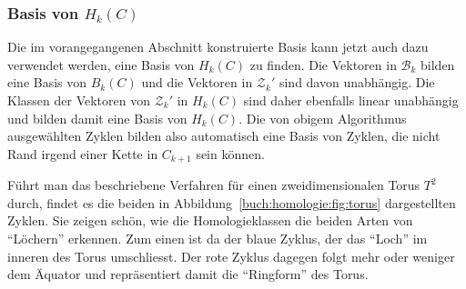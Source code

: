 \subsubsection{Basis von $H_k(C)$}
Die im vorangegangenen Abschnitt konstruierte Basis kann jetzt auch
dazu verwendet werden, eine Basis von $H_k(C)$ zu finden.
Die Vektoren in $\mathcal{B}_k$ bilden eine Basis von $B_k(C)$
und die Vektoren in $\mathcal{Z}_k'$ sind davon unabhängig.
Die Klassen der Vektoren von $\mathcal{Z}_k'$ in $H_k(C)$ sind
daher ebenfalls linear unabhängig und bilden damit eine Basis
von $H_k(C)$.
Die von obigem Algorithmus ausgewählten Zyklen bilden also automatisch
eine Basis von Zyklen, die nicht Rand irgend einer Kette in $C_{k+1}$
sein können.


Führt man das beschriebene Verfahren für einen zweidimensionalen Torus $T^2$ durch,
findet es die beiden in Abbildung~\ref{buch:homologie:fig:torus} dargestellten
Zyklen.
Sie zeigen schön, wie die Homologieklassen die beiden Arten von ``Löchern''
erkennen.
Zum einen ist da der blaue Zyklus, der das ``Loch'' im inneren des Torus
umschliesst.
Der rote Zyklus dagegen folgt mehr oder weniger dem Äquator und repräsentiert
damit die ``Ringform'' des Torus.
